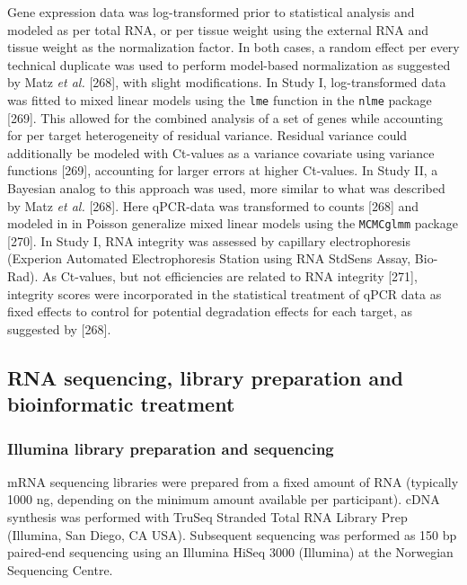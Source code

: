 \documentclass[twoside,10pt]{gihclass} %
\begin{document}
Gene expression data was log-transformed prior to statistical analysis and modeled as per total RNA,
or per tissue weight using the external RNA and tissue weight as the normalization factor.
In both cases, a random effect per every technical duplicate was used to perform model-based normalization as suggested by Matz \emph{et al.}
{[}268{]}, with slight modifications. In Study I, log-transformed data was fitted to mixed linear models using the \texttt{lme} function in the \texttt{nlme} package
{[}269{]}.
This allowed for the combined analysis of a set of genes while accounting for per target heterogeneity of residual variance. Residual variance could additionally be modeled with Ct-values as a variance covariate using variance functions
{[}269{]},
accounting for larger errors at higher Ct-values.
In Study II, a Bayesian analog to this approach was used, more similar to what was described by Matz \emph{et al.}
{[}268{]}.
Here qPCR-data was transformed to counts {[}268{]} and modeled in in Poisson generalize mixed linear models using the \texttt{MCMCglmm} package
{[}270{]}.
In Study I, RNA integrity was assessed by capillary electrophoresis (Experion Automated Electrophoresis Station using RNA StdSens Assay, Bio-Rad).
As Ct-values, but not efficiencies are related to RNA integrity {[}271{]},
integrity scores were incorporated in the statistical treatment of qPCR data as fixed effects to control for potential degradation effects for each target, as suggested by
{[}268{]}.

\hypertarget{rna-sequencing-library-preparation-and-bioinformatic-treatment}{%
\subsection{RNA sequencing, library preparation and bioinformatic treatment}\label{rna-sequencing-library-preparation-and-bioinformatic-treatment}}

\hypertarget{illumina-library-preparation-and-sequencing}{%
\subsubsection{Illumina library preparation and sequencing}\label{illumina-library-preparation-and-sequencing}}

mRNA sequencing libraries were prepared from a fixed amount of RNA (typically 1000 ng, depending on the minimum amount available per participant). cDNA synthesis was performed with TruSeq Stranded Total RNA Library Prep (Illumina, San Diego, CA USA). Subsequent sequencing was performed as 150 bp paired-end sequencing using an Illumina HiSeq 3000 (Illumina) at the Norwegian Sequencing Centre.
\end{document}
